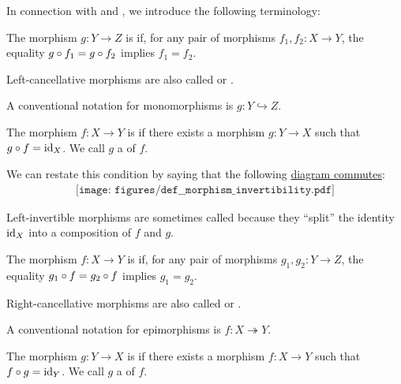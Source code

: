 \begin{definition}\label{def:morphism_invertibility}
  In connection with  and , we introduce the following terminology:
  \begin{thmenum}
     The morphism \( g: Y \to Z \) is  if, for any pair of morphisms \( f_1, f_2: X \to Y \), the equality \( g \bincirc f_1 = g \bincirc f_2 \) implies \( f_1 = f_2 \).

    Left-cancellative morphisms are also called  or .

    A conventional notation for monomorphisms is \( g: Y \hookrightarrow Z \).

     The morphism \( f: X \to Y \) is  if there exists a morphism \( g: Y \to X \) such that \( g \bincirc f = \id_X \). We call \( g \) a  of \( f \).

    We can restate this condition by saying that the following \hyperref[def:categorical_diagram]{diagram commutes}:
    \begin{equation}\label{eq:def:morphism_invertibility/left_invertible}
      \begin{aligned}
        \texttt{[image: figures/def\_\_morphism\_invertibility.pdf]}
      \end{aligned}
    \end{equation}

    Left-invertible morphisms are sometimes called  because they \enquote{split} the identity \( \operatorname{id}_X \) into a composition of \( f \) and \( g \).

     The morphism \( f: X \to Y \) is  if, for any pair of morphisms \( g_1, g_2: Y \to Z \), the equality \( g_1 \bincirc f = g_2 \bincirc f \) implies \( g_1 = g_2 \).

    Right-cancellative morphisms are also called  or .

    A conventional notation for epimorphisms is \( f: X \twoheadrightarrow Y \).

     The morphism \( g: Y \to X \) is  if there exists a morphism \( f: X \to Y \) such that \( f \bincirc g = \id_Y \). We call \( g \) a  of \( f \).


\end{thmenum}
\end{definition}
